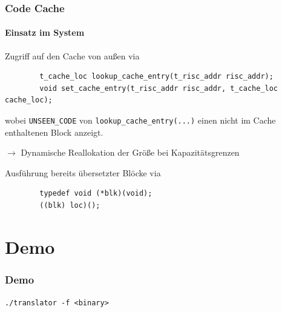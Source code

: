 \documentclass[german]{tum-presentation}
\newcommand{\refer}[0]{\ensuremath{\rightarrow} }
\begin{document}
\begin{frame}[fragile]
	\frametitle{Code Cache}
	\framesubtitle{Einsatz im System}
	
	Zugriff auf den Cache von außen via
	\begin{lstlisting}
		t_cache_loc lookup_cache_entry(t_risc_addr risc_addr);
		void set_cache_entry(t_risc_addr risc_addr, t_cache_loc cache_loc);
	\end{lstlisting}
	
	wobei \verb!UNSEEN_CODE! von \verb!lookup_cache_entry(...)! einen nicht im Cache enthaltenen Block anzeigt.
	
	\refer Dynamische Reallokation der Größe bei Kapazitätsgrenzen
	
	\vspace{0.5cm}
	\pause
	Ausführung bereits übersetzter Blöcke via
	\begin{lstlisting}
		typedef void (*blk)(void);
		((blk) loc)();
	\end{lstlisting}
\end{frame}

\section{Demo}
\begin{frame}[fragile, c]
	\frametitle{Demo}

	\begin{center}
		\Huge \texttt{./translator -f <binary>}
	\end{center}
\end{frame}
\end{document}

